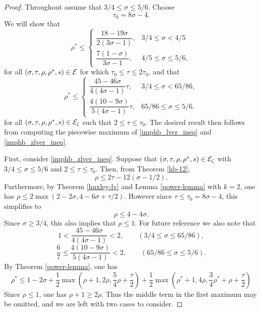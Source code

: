 \derived 
{}

\begin{proof}
Throughout assume that $3/4 \le \sigma \le 5/6$. Choose 
\[
\tau_0 = 8\sigma - 4.
\]
We will show that
\begin{equation}\label{imphb_lver_ineq}
\rho^* \le \begin{cases}
\dfrac{18 - 19\sigma}{2(3\sigma - 1)},&3/4 \le \sigma < 4/5\\
\dfrac{7(1 - \sigma)}{3\sigma - 1},&4/5 \le \sigma \le 5/6,
\end{cases} 
\end{equation}
for all $(\sigma, \tau, \rho, \rho^*, s) \in \mathcal{E}$ for which $\tau_0 \le \tau \le 2\tau_0$, and that
\begin{equation}\label{imphb_zlver_ineq}
\rho^* \le \begin{cases}
\dfrac{45 - 46\sigma}{4(4\sigma - 1)}\tau,&3/4 \le \sigma < 65/86,\\
\dfrac{4(10 - 9\sigma)}{5(4\sigma - 1)}\tau,&65/86 \le \sigma \le 5/6.
\end{cases}
\end{equation}
for all $(\sigma, \tau, \rho, \rho^*, s) \in \mathcal{E}_\zeta$ such that $2 \le \tau \le \tau_0$. The desired result then follows from computing the piecewise maximum of \eqref{imphb_lver_ineq} and \eqref{imphb_zlver_ineq}. 

First, consider \eqref{imphb_zlver_ineq}. Suppose that $(\sigma, \tau, \rho, \rho^*, s)\in \mathcal{E}_\zeta$ with $3/4 \le \sigma \le 5/6$ and $2 \le \tau \le \tau_0$. Then, from Theorem \ref{hb-12},
\begin{equation}\label{hb_lv_rho_form}
\rho \le 2\tau - 12(\sigma - 1/2).
\end{equation}
Furthermore, by Theorem \ref{huxley-lv} and Lemma \ref{power-lemma} with $k = 2$, one has $\rho \le 2\max(2 - 2\sigma, 4 - 6\sigma + \tau/2)$. However since $\tau \le \tau_0 = 8\sigma - 4$, this simplifies to 
\begin{equation}
\label{huxley_lv_rho_form2}
\rho \le 4 - 4\sigma.
\end{equation}
Since $\sigma \ge 3/4$, this also implies that $\rho \le 1$. For future reference we also note that 
\begin{equation}\label{zlver:tau_gradient_1}
1 < \frac{45 - 46\sigma}{4(4\sigma - 1)} < 2,\qquad (3/4 \le \sigma \le 65/86),
\end{equation}
\begin{equation}\label{zlver:tau_gradient_2}
\frac{6}{7} \le \frac{4(10 - 9\sigma)}{5(4\sigma - 1)} < 2,\qquad (65/86 \le \sigma \le 5/6).
\end{equation}
By Theorem \ref{power-lemma}, one has
\[
\rho^* \leq 1-2\sigma + \frac{1}{2}\max(\rho+1, 2\rho, \frac{5}{4}\rho+\frac{\tau}{2}) + \frac{1}{2}\max(\rho^*+1, 4\rho, \frac{3}{4}\rho^*+\rho+\frac{\tau}{2})
\]
Since $\rho \le 1$, one has $\rho + 1 \ge 2\rho$. Thus the middle term in the first maximum may be omitted, and we are left with two cases to consider. 


\end{proof}
